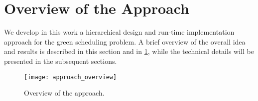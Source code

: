 \section{Overview of the Approach}
\label{sec:overview}

We develop in this work a hierarchical design and run-time implementation approach for the green scheduling problem.
A brief overview of the overall idea and results is described in this section and in \cref{fig:overview}, while the technical details will be presented in the subsequent sections.

\begin{figure}
  \centering
  \texttt{[image: approach\_overview]}
  \caption{Overview of the approach.}
  \label{fig:overview}
\end{figure}

